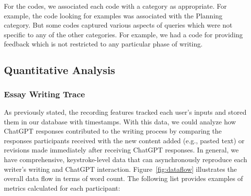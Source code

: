\documentclass[manuscript,screen,acmsmall]{acmart}
\begin{document}
For the codes, we associated each code with a category as appropriate.
For example, the code looking for examples was associated with the Planning category.
But some codes captured various aspects of queries which were not specific to any of the other categories.
For example, we had a code for providing feedback which is not restricted to any particular phase of writing.



\subsection{Quantitative Analysis}

\subsubsection{Essay Writing Trace}
As previously stated, the recording features tracked each user's inputs and stored them in our database with timestamps. With this data, we could analyze how ChatGPT responses contributed to the writing process by comparing the responses participants received with the new content added (e.g., pasted text) or revisions made immediately after receiving ChatGPT responses. In general, we have comprehensive, keystroke-level data that can asynchronously reproduce each writer's writing and ChatGPT interaction. Figure~\ref{fig:dataflow} illustrates the overall data flow in terms of word count. The following list provides examples of metrics calculated for each participant:
\end{document}
